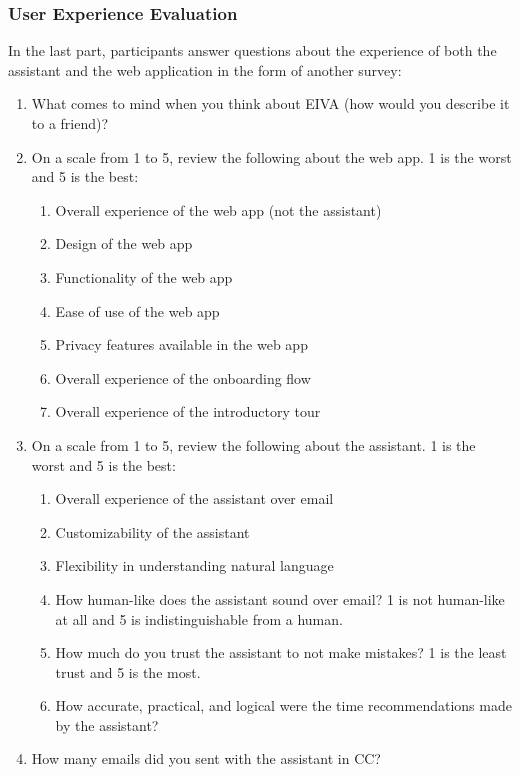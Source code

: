 \documentclass{article}
\begin{document}
\subsubsection{User Experience Evaluation}

In the last part, participants answer questions about the experience of both the assistant and the web application in the form of another survey:

\begin{enumerate}
	\item What comes to mind when you think about EIVA (how would you describe it to a friend)?
	\item On a scale from 1 to 5, review the following about the web app. 1 is the worst and 5 is the best:
	      \begin{enumerate}
	      	\item Overall experience of the web app (not the assistant)
	      	\item Design of the web app
	      	\item Functionality of the web app
	      	\item Ease of use of the web app
	      	\item Privacy features available in the web app
	      	\item Overall experience of the onboarding flow
	      	\item Overall experience of the introductory tour
	      \end{enumerate}
	\item On a scale from 1 to 5, review the following about the assistant. 1 is the worst and 5 is the best:
	      \begin{enumerate}
	      	\item Overall experience of the assistant over email
	      	\item Customizability of the assistant
	      	\item Flexibility in understanding natural language
	      	\item How human-like does the assistant sound over email? 1 is not human-like at all and 5 is indistinguishable from a human.
	      	\item How much do you trust the assistant to not make mistakes? 1 is the least trust and 5 is the most.
	      	\item How accurate, practical, and logical were the time recommendations made by the assistant?
	      \end{enumerate}
	\item How many emails did you sent with the assistant in CC?

\end{enumerate}
\end{document}
